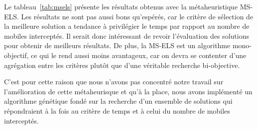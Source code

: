    	Le tableau~\ref{tab:msels} présente les résultats obtenus avec la métaheuristique MS-ELS. Les résultats ne sont pas aussi bons qu'espérés, car le critère de sélection de la meilleure solution a tendance à privilégier le temps par rapport au nombre de mobiles interceptés. Il serait donc intéressant de revoir l'évaluation des solutions pour obtenir de meilleurs résultats. De plus, la MS-ELS est un algorithme mono-objectif, ce qui le rend aussi moins avantageux, car on devra se contenter d'une agrégation entre les critères plutôt que d'une véritable recherche bi-objective.
    	
    C'est pour cette raison que nous n'avons pas concentré notre travail sur l'amélioration de cette métaheurisque et qu'à la place, nous avons implémenté un algorithme génétique fondé sur la recherche d'un ensemble de solutions qui répondraient à la fois au critère de temps et à celui du nombre de mobiles interceptés.
    	
